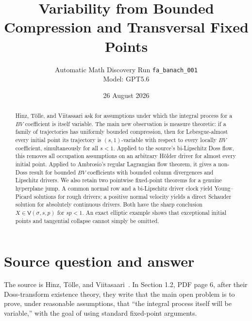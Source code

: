 \documentclass[11pt]{article}
\title{Variability from Bounded Compression and Transversal Fixed Points}
\author{Automatic Math Discovery Run \texttt{fa\_banach\_001}\\Model: GPT5.6}
\date{26 August 2026}
\begin{document}
\maketitle

\begin{center}
\end{center}

\begin{abstract}
Hinz, T\"olle, and Viitasaari ask for assumptions under which the integral
process for a $BV$ coefficient is itself variable.  The main new observation
is measure theoretic: if a family of trajectories has uniformly bounded
compression, then for Lebesgue-almost every initial point its trajectory is
$(s,1)$-variable with respect to every locally $BV$ coefficient, simultaneously
for all $s<1$.  Applied to the source's bi-Lipschitz Doss flow, this removes
all occupation assumptions on an arbitrary H\"older driver for almost every
initial point.  Applied to Ambrosio's regular Lagrangian flow theorem, it gives
a non-Doss result for bounded $BV$ coefficients with bounded column
divergences and Lipschitz drivers.  We also retain two pointwise fixed-point
theorems for a genuine hyperplane jump.  A common normal row and a
bi-Lipschitz driver clock yield Young--Picard solutions for rough drivers; a
positive normal velocity yields a direct Schauder solution for absolutely
continuous drivers.  Both have the sharp conclusion
$X\in\mathsf V(\sigma,s,p)$ for $sp<1$.  An exact elliptic example shows that
exceptional initial points and tangential collapse cannot simply be omitted.
\end{abstract}

\section{Source question and answer}

The source is Hinz, T\"olle, and Viitasaari~\cite{HTV}.  In Section 1.2,
PDF page 6, after their Doss-transform existence theory, they write that the
main open problem is to prove, under reasonable assumptions, that ``the
integral process itself will be variable,'' with the goal of using standard
fixed-point arguments.
\end{document}
